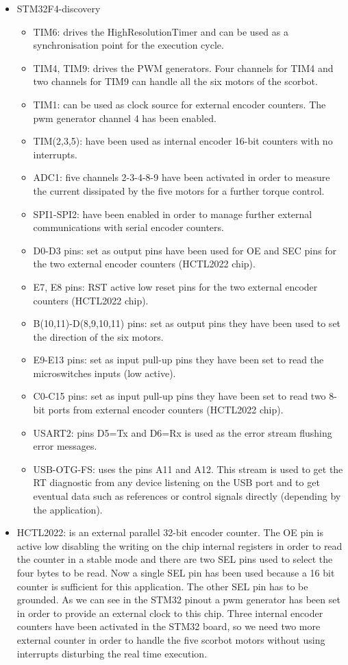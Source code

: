 \begin{itemize}
\item STM32F4-discovery
  \begin{itemize}
  \item TIM6: drives the HighResolutionTimer and can be used as a synchronisation point for the execution cycle.
  \item TIM4, TIM9: drives the PWM generators. Four channels for TIM4 and two channels for TIM9 can handle all the six motors of the scorbot.
  \item TIM1: can be used as clock source for external encoder counters. The pwm generator channel 4 has been enabled.
  \item TIM(2,3,5): have been used as internal encoder 16-bit counters with no interrupts.
  \item ADC1: five channels 2-3-4-8-9 have been activated in order to measure the current dissipated by the five motors for a further torque control.
  \item SPI1-SPI2: have been enabled in order to manage further external communications with serial encoder counters.
  \item D0-D3 pins: set as output pins have been used for OE and SEC pins for the two external encoder counters (HCTL2022 chip).
  \item E7, E8 pins: RST active low reset pins for the two external encoder counters (HCTL2022 chip).
  \item B(10,11)-D(8,9,10,11) pins: set as output pins they have been used to set the direction of the six motors.
  \item E9-E13 pins: set as input pull-up pins they have been set to read the microswitches inputs (low active).
  \item C0-C15 pins: set as input pull-up pins they have been set to read two 8-bit ports from external encoder counters (HCTL2022 chip).
  \item USART2: pins D5=Tx and D6=Rx is used as the error stream flushing error messages.
  \item USB-OTG-FS: uses the pins A11 and A12. This stream is used to get the RT diagnostic from any device listening on the USB port and to get eventual data such as references or control signals directly (depending by the application).
  \end{itemize}
\item HCTL2022: is an external parallel 32-bit encoder counter. The OE pin is active low disabling the writing on the chip internal registers in order to read the counter in a stable mode and there are two SEL pins used to select the four bytes to be read. Now a single SEL pin has been used because a 16 bit counter is sufficient for this application. The other SEL pin has to be grounded. As we can see in the STM32 pinout a pwm generator has been set in order to provide an external clock to this chip. Three internal encoder counters have been activated in the STM32 board, so we need two more external counter in order to handle the five scorbot motors without using interrupts disturbing the real time execution.


\end{itemize}
